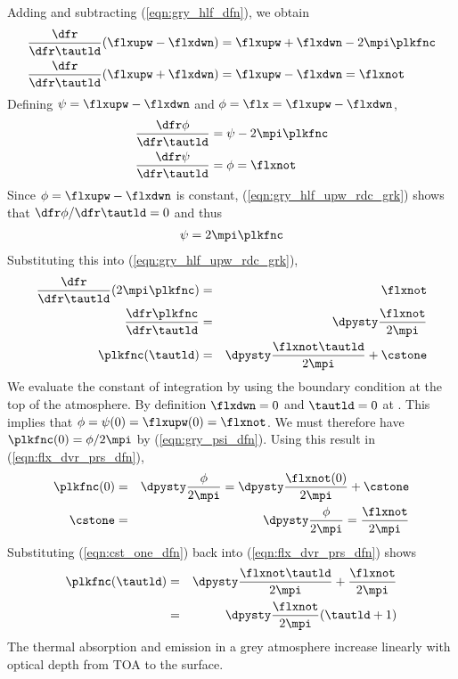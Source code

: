 \documentclass[12pt]{article}
\begin{document}
Adding and subtracting (\ref{eqn:gry_hlf_dfn}), we obtain
\begin{subequations}
\label{eqn:gry_hlf_rdc}
\begin{align}
\label{eqn:gry_hlf_dwn_rdc}
\frac{\dfr}{\dfr\tautld}(\flxupw - \flxdwn) & = \flxupw + \flxdwn - 2\mpi\plkfnc \\
\label{eqn:gry_hlf_upw_rdc}
\frac{\dfr}{\dfr\tautld}(\flxupw + \flxdwn) & = \flxupw - \flxdwn = \flxnot
\end{align}
\end{subequations}
Defining $\psi = \flxupw - \flxdwn$ and $\phi = \flx = \flxupw - \flxdwn$,
\begin{subequations}
\label{eqn:gry_hlf_rdc_grk}
\begin{align}
\label{eqn:gry_hlf_dwn_rdc_grk}
\frac{\dfr\phi}{\dfr\tautld} & = \psi - 2\mpi\plkfnc \\
\label{eqn:gry_hlf_upw_rdc_grk}
\frac{\dfr\psi}{\dfr\tautld} & = \phi = \flxnot
\end{align}
\end{subequations}
Since $\phi = \flxupw - \flxdwn$ is constant,
(\ref{eqn:gry_hlf_upw_rdc_grk}) shows that $\dfr\phi/\dfr\tautld = 0$
and thus
\begin{eqnarray}
\psi = 2\mpi\plkfnc
\label{eqn:gry_psi_dfn}
\end{eqnarray}
Substituting this into (\ref{eqn:gry_hlf_upw_rdc_grk}),
\begin{eqnarray}
\frac{\dfr}{\dfr\tautld}(2\mpi\plkfnc) & = & \flxnot \nonumber \\
\frac{\dfr\plkfnc}{\dfr\tautld} & = & \dpysty \frac{\flxnot}{2\mpi} \nonumber \\
\plkfnc(\tautld) & = & \dpysty \frac{\flxnot\tautld}{2\mpi} + \cstone
\label{eqn:flx_dvr_prs_dfn}
\end{eqnarray}
We evaluate the constant of integration by using the boundary
condition at the top of the atmosphere.
By definition $\flxdwn = 0$ and $\tautld = 0$ at .
This implies that $\phi = \psi(0) = \flxupw(0) = \flxnot$.
We must therefore have $\plkfnc(0) = \phi/2\mpi$ by
(\ref{eqn:gry_psi_dfn}).
Using this result in (\ref{eqn:flx_dvr_prs_dfn}),
\begin{eqnarray}
\plkfnc(0) & = & \dpysty \frac{\phi}{2\mpi} = 
\dpysty \frac{\flxnot(0)}{2\mpi} + \cstone \nonumber \\
\cstone & = & \dpysty \frac{\phi}{2\mpi} = \frac{\flxnot}{2\mpi} \nonumber \\
\label{eqn:cst_one_dfn}
\end{eqnarray}
Substituting (\ref{eqn:cst_one_dfn}) back into
(\ref{eqn:flx_dvr_prs_dfn}) shows  
\begin{eqnarray}
\plkfnc(\tautld) & = & \dpysty \frac{\flxnot\tautld}{2\mpi} + \frac{\flxnot}{2\mpi} \nonumber \\
& = & \dpysty \frac{\flxnot}{2\mpi}(\tautld + 1)
\label{eqn:gry_plk_flx_dfn}
\end{eqnarray}
The thermal absorption and emission in a grey atmosphere increase
linearly with optical depth from TOA to the surface.
\end{document}
